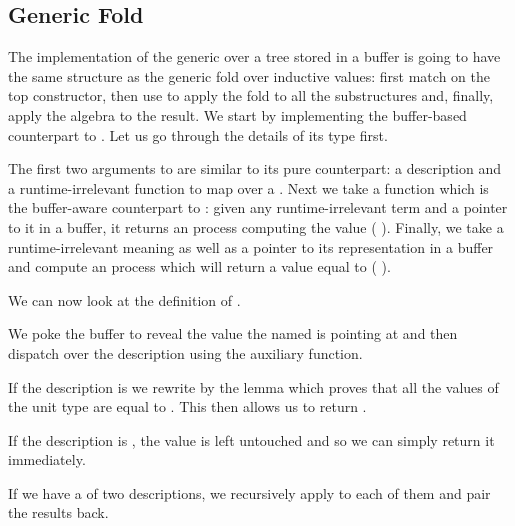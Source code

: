 
\subsection{Generic Fold}\label{sec:bufferfold}

The implementation of the generic  over a tree stored
in a buffer is going to have the same structure as the generic fold over
inductive values: first match on the top constructor, then use 
to apply the fold to all the substructures and, finally, apply the algebra to
the result.
%
We start by implementing the buffer-based counterpart to .
Let us go through the details of its type first.


The first two arguments to  are similar to its pure
counterpart: a description  and a runtime-irrelevant function
 to map over a .
%
Next we take a function which is the buffer-aware counterpart to :
given any runtime-irrelevant term  and a pointer to it in a buffer,
it returns an  process computing the value ( ).
%
Finally, we take a runtime-irrelevant meaning 
as well as a pointer to its representation in a buffer and compute
an  process which will return a value equal to
(   ).

We can now look at the definition of .


We poke the buffer to reveal the value the 
named  is pointing at and then dispatch over the description
 using the  auxiliary function.

If the description is  we rewrite by the lemma
 which proves that all the values of the unit type
are equal to \IdrisData{()}. This then allows us to return \IdrisData{()}.

If the description is , the value is left untouched and so
we can simply return it immediately.

If we have a  of two descriptions, we recursively apply
 to each of them and pair the results back.

